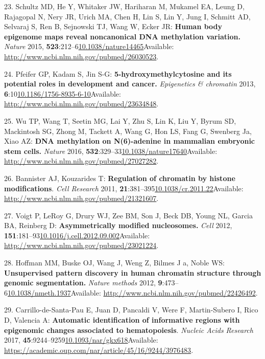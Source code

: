 \documentclass[
]{book}
\begin{document}
\leavevmode\hypertarget{ref-Schultz2015}{}%
23. Schultz MD, He Y, Whitaker JW, Hariharan M, Mukamel EA, Leung D, Rajagopal N, Nery JR, Urich MA, Chen H, Lin S, Lin Y, Jung I, Schmitt AD, Selvaraj S, Ren B, Sejnowski TJ, Wang W, Ecker JR: \textbf{Human body epigenome maps reveal noncanonical DNA methylation variation.} \emph{Nature} 2015, \textbf{523}:212--6\href{https://doi.org/10.1038/nature14465}{10.1038/nature14465}Available: \url{http://www.ncbi.nlm.nih.gov/pubmed/26030523}.

\leavevmode\hypertarget{ref-Pfeifer2013}{}%
24. Pfeifer GP, Kadam S, Jin S-G: \textbf{5-hydroxymethylcytosine and its potential roles in development and cancer.} \emph{Epigenetics \& chromatin} 2013, \textbf{6}:10\href{https://doi.org/10.1186/1756-8935-6-10}{10.1186/1756-8935-6-10}Available: \url{http://www.ncbi.nlm.nih.gov/pubmed/23634848}.

\leavevmode\hypertarget{ref-Wu2016}{}%
25. Wu TP, Wang T, Seetin MG, Lai Y, Zhu S, Lin K, Liu Y, Byrum SD, Mackintosh SG, Zhong M, Tackett A, Wang G, Hon LS, Fang G, Swenberg Ja, Xiao AZ: \textbf{DNA methylation on N(6)-adenine in mammalian embryonic stem cells.} \emph{Nature} 2016, \textbf{532}:329--33\href{https://doi.org/10.1038/nature17640}{10.1038/nature17640}Available: \url{http://www.ncbi.nlm.nih.gov/pubmed/27027282}.

\leavevmode\hypertarget{ref-Bannister2011}{}%
26. Bannister AJ, Kouzarides T: \textbf{Regulation of chromatin by histone modifications}. \emph{Cell Research} 2011, \textbf{21}:381--395\href{https://doi.org/10.1038/cr.2011.22}{10.1038/cr.2011.22}Available: \url{http://www.ncbi.nlm.nih.gov/pubmed/21321607}.

\leavevmode\hypertarget{ref-Voigt2012}{}%
27. Voigt P, LeRoy G, Drury WJ, Zee BM, Son J, Beck DB, Young NL, Garcia BA, Reinberg D: \textbf{Asymmetrically modified nucleosomes.} \emph{Cell} 2012, \textbf{151}:181--93\href{https://doi.org/10.1016/j.cell.2012.09.002}{10.1016/j.cell.2012.09.002}Available: \url{http://www.ncbi.nlm.nih.gov/pubmed/23021224}.

\leavevmode\hypertarget{ref-Hoffman2012}{}%
28. Hoffman MM, Buske OJ, Wang J, Weng Z, Bilmes J a, Noble WS: \textbf{Unsupervised pattern discovery in human chromatin structure through genomic segmentation.} \emph{Nature methods} 2012, \textbf{9}:473--6\href{https://doi.org/10.1038/nmeth.1937}{10.1038/nmeth.1937}Available: \url{http://www.ncbi.nlm.nih.gov/pubmed/22426492}.

\leavevmode\hypertarget{ref-Carrillo-de-Santa-Pau2017}{}%
29. Carrillo-de-Santa-Pau E, Juan D, Pancaldi V, Were F, Martin-Subero I, Rico D, Valencia A: \textbf{Automatic identification of informative regions with epigenomic changes associated to hematopoiesis}. \emph{Nucleic Acids Research} 2017, \textbf{45}:9244--9259\href{https://doi.org/10.1093/nar/gkx618}{10.1093/nar/gkx618}Available: \url{https://academic.oup.com/nar/article/45/16/9244/3976483}.
\end{document}
